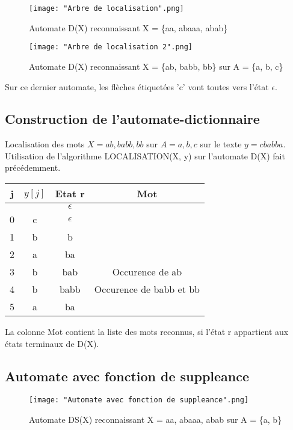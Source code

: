 \documentclass[11pt,a4paper]{article}
\begin{document}
	\begin{figure}[ht]
		\centering
		\texttt{[image: "Arbre de localisation".png]}
		\caption{Automate D(X) reconnaissant X = \{aa, abaaa, abab\}}
	\end{figure}
	\newpage
	\begin{figure}[ht]
		\centering
		\texttt{[image: "Arbre de localisation 2".png]}
		\caption{Automate D(X) reconnaissant X = \{ab, babb, bb\} sur A = \{a, b, c\}}
	\end{figure}
	Sur ce dernier automate, les flèches étiquetées 'c' vont toutes vers l'état $\epsilon$.\\


	\subsection{Construction de l'automate-dictionnaire}

	Localisation des mots $X = {ab, babb, bb}$ sur $A = {a,b,c}$ sur le texte $y = cbabba$.\\
	Utilisation de l'algorithme LOCALISATION(X, y) sur l'automate D(X) fait précédemment.\\
	\begin{center}
		\begin{tabular}{|c|c|c|c|}
			\hline
			j & $y[j]$ & Etat r & Mot\\
			\hline 
			 &  & $\epsilon$ &\\ 
			\hline 
			0 & c & $\epsilon$ &\\ 
			\hline
			1 & b & b &\\
			\hline
			2 & a & ba &\\
			\hline
			3 & b & bab & Occurence de ab\\
			\hline
			4 & b & babb & Occurence de babb et bb\\
			\hline
			5 & a & ba &\\
			\hline
		\end{tabular} 
	\end{center}
	La colonne Mot contient la liste des mots reconnus, si l'état r appartient aux états terminaux de D(X).\\
	
	\newpage
	
	\subsection{Automate avec fonction de suppleance}
	
	\begin{figure}[ht]
		\centering
		\texttt{[image: "Automate avec fonction de suppleance".png]}
		\caption{Automate DS(X) reconnaissant X = {aa, abaaa, abab} sur A = \{a, b\}}
		\label{DS(X)}
	\end{figure}
\end{document}
